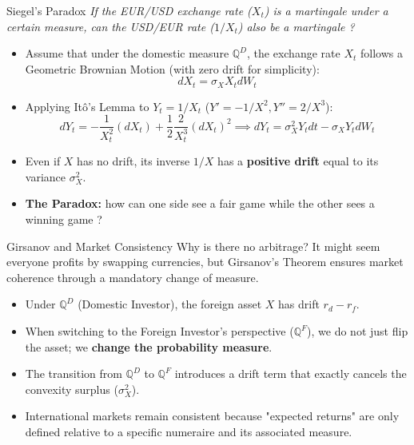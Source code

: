 \documentclass{beamer}
\begin{document}
\begin{frame}{Siegel's Paradox}
	\emph{If the EUR/USD exchange rate ($X_t$) is a martingale under a certain measure, can the USD/EUR rate ($1/X_t$) also be a martingale ?}

	\begin{itemize}
		\item<2-> Assume that under the domestic measure $\mathbb{Q}^D$, the exchange rate $X_t$ follows a Geometric Brownian Motion (with zero drift for simplicity):
	\[ dX_t = \sigma_X X_t dW_t \]
	\item<2-> Applying Itô's Lemma to $Y_t = 1/X_t$ ($Y' = -1/X^2, Y'' = 2/X^3$):
	\begin{equation*}
		dY_t = -\frac{1}{X_t^2}(dX_t) + \frac{1}{2}\frac{2}{X_t^3}(dX_t)^2 \implies
		dY_t = \sigma_X^2 Y_t dt - \sigma_X Y_t dW_t
	\end{equation*}

	\item<2-> Even if $X$ has no drift, its inverse $1/X$ has a \textbf{positive drift} equal to its variance $\sigma_X^2$.

%
	\item<3-> \textbf{The Paradox:} how can one side see a fair game while the other sees a winning game ? %
	\end{itemize}
\end{frame}

\begin{frame}{Girsanov and Market Consistency}
	Why is there no arbitrage? It might seem everyone profits by swapping currencies, but Girsanov's Theorem ensures market coherence through a mandatory change of measure.

	\begin{itemize}
		\item Under $\mathbb{Q}^D$ (Domestic Investor), the foreign asset $X$ has drift $r_d - r_f$.
		\item When switching to the Foreign Investor's perspective ($\mathbb{Q}^F$), we do not just flip the asset; we \textbf{change the probability measure}.
		\item The transition from $\mathbb{Q}^D$ to $\mathbb{Q}^F$ introduces a drift term that exactly cancels the convexity surplus ($\sigma_X^2$).
		\item International markets remain consistent because "expected returns" are only defined relative to a specific numeraire and its associated measure.
	\end{itemize}
\end{frame}
\end{document}
